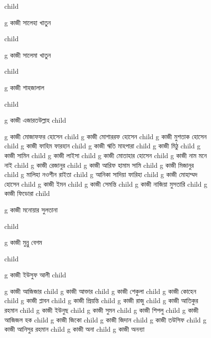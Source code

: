 \documentclass{article}
\begin{document}
\begin{figure}
{\begin{genealogypicture}
{{{{{%
        }%
        child{
          g{ কাজী সালেহা খাতুন }

        }%
        child{
          g{ কাজী সালেমা খাতুন }

        }%
        child{
          g{ কাজী শাহজালাল }

        }
      }
        child{
        g{ কাজী এজারতউল্লাহ  }
          child{    g{ কাজী মোজাফফর হোসেন }
              child{
                g{ কাজী মোশাররফ হোসেন }
                  child{    g{ কাজী মুশতাক হোসেন }
                    child{    g{ কাজী ফাহিম ফারহান }   }
                    child{    g{ কাজী ঋতি মাহপারা }   }
                  }
                  child{    g{ কাজী মিঠু }
                    child{    g{ কাজী সামিন  }   }
                    child{    g{ কাজী লাইসা }   }
                  }
              }
              child{
              g{ কাজী মোতাহার হোসেন  }
              child{    g{ কাজী নাম মনে নাই  }   }
              child{    g{ কাজী রেজানুর  } 
                  child{    g{ কাজী আরিফ হামাম সামি }   }
              }
              child{    g{ কাজী মিজানুর }  
                  child{    g{ মালিহা নওশীন রাইতা    }   }
                  child{    g{ আনিকা সাদিয়া ফারিহা }   }
              }
            }
            child{
              g{ কাজী মোহাম্মদ হোসেন }
              child{    g{ কাজী ইমন  } 
                child{ g{ কাজী সেমন্তি }  }
                }
              child{    g{ কাজী নাজিয়া মুসতারি }
              child{ g{ কাজী ফিডোরা  }  }
              }
            }
            child{
              g{ কাজী মনোয়ার সুলতানা }

            }%
            child{
              g{ কাজী মুন্নু বেগম }

            }

          }       
        }
      }
      child{
        g{ কাজী ইউসুফ আলী }
          child{    g{ কাজী আজিজার } 
              child{    g{ কাজী আক্তার }
                child{    g{ কাজী শেকুলা }   }
                child{    g{ কাজী কোহেন } 
                    child{    g{ কাজী প্লাবন }   }
                    child{    g{ কাজী প্রিয়ন্তি }   }
                  }
                child{    g{ কাজী রাজু }   }  
              }
              child{    g{ কাজী আতিকুর রহমান }   }
              child{    g{ কাজী ইউনুছ } 
                  child{    g{ কাজী সুমন }   }
                  child{    g{ কাজী শিপলু  }   }
              }
              child{    g{ কাজী আজিজল হক }
                  child{    g{ কাজী জিকো } child{    g{ কাজী জিদান }   }   }
                  child{    g{ কাজী তউসিফ }   }
              }
              child{    g{ কাজী আনিসুর রহমান } 
                  child{    g{ কাজী অনা  }   }
                  child{    g{ কাজী অনন্যা }   }
              }

}}}}
\end{genealogypicture}}
\end{figure}
\end{document}

